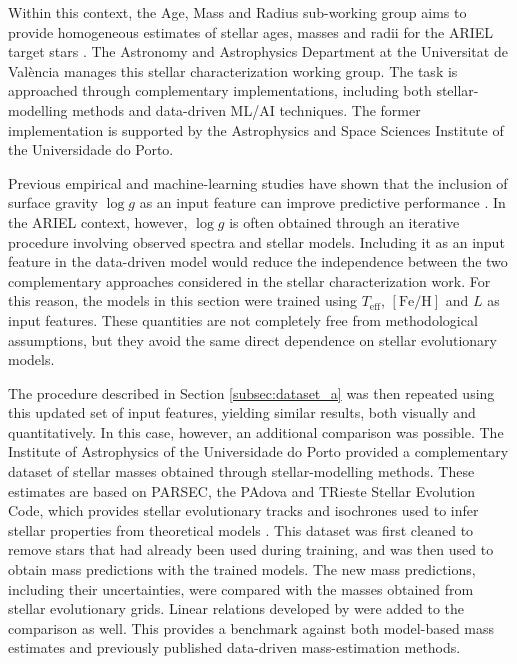 Within this context, the Age, Mass and Radius sub-working group aims to provide homogeneous estimates of stellar ages, masses and radii for the ARIEL target stars \citep{arielAMRsubwg}. The Astronomy and Astrophysics Department at the Universitat de València manages this stellar characterization working group. The task is approached through complementary implementations, including both stellar-modelling methods and data-driven ML/AI techniques. The former implementation is supported by the Astrophysics and Space Sciences Institute of the Universidade do Porto.

Previous empirical and machine-learning studies have shown that the inclusion of surface gravity $\log g$ as an input feature can improve predictive performance \citep{moya2018}. In the ARIEL context, however, $\log g$ is often obtained through an iterative procedure involving observed spectra and stellar models. Including it as an input feature in the data-driven model would reduce the independence between the two complementary approaches considered in the stellar characterization work. For this reason, the models in this section were trained using $T_{\mathrm{eff}}$, $[\mathrm{Fe}/\mathrm{H}]$ and $L$ as input features. These quantities are not completely free from methodological assumptions, but they avoid the same direct dependence on stellar evolutionary models.

The procedure described in Section \ref{subsec:dataset_a} was then repeated using this updated set of input features, yielding similar results, both visually and quantitatively. In this case, however, an additional comparison was possible. The Institute of Astrophysics of the Universidade do Porto provided a complementary dataset of stellar masses obtained through stellar-modelling methods. These estimates are based on PARSEC, the PAdova and TRieste Stellar Evolution Code, which provides stellar evolutionary tracks and isochrones used to infer stellar properties from theoretical models \citep{bressan2012}. This dataset was first cleaned to remove stars that had already been used during training, and was then used to obtain mass predictions with the trained models. The new mass predictions, including their uncertainties, were compared with the masses obtained from stellar evolutionary grids. Linear relations developed by \citet{moya2018} were added to the comparison as well. This provides a benchmark against both model-based mass estimates and previously published data-driven mass-estimation methods.

